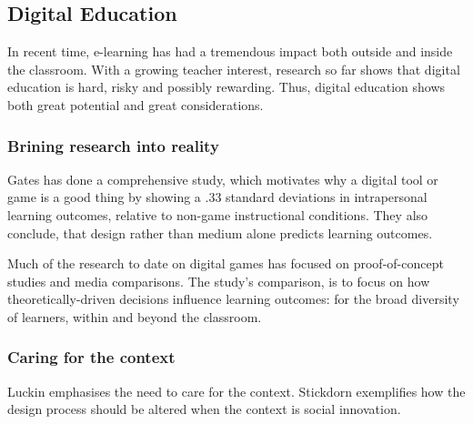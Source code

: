 



    

    

    \subsection{Digital Education}

    In recent time, e-learning has had a tremendous impact both outside and inside the classroom. With a growing teacher interest, research so far shows that digital education is hard, risky and possibly rewarding. Thus, digital education shows both great potential and great considerations.

    \subsubsection{Brining research into reality}

    Gates \cite{gates} has done a comprehensive study, which motivates why a digital tool or game is a good thing by showing a .33 standard deviations in intrapersonal learning outcomes, relative to non-game instructional conditions. They also conclude, that design rather than medium alone predicts learning outcomes.

    Much of the research to date on digital games has focused on proof-of-concept studies and media comparisons. The study's comparison, is to focus on how theoretically-driven decisions influence learning outcomes: for the broad diversity of learners, within and beyond the classroom.

    \subsubsection{Caring for the context}
    Luckin \cite{luckin} emphasises the need to care for the context. Stickdorn \cite{stickdorn} exemplifies how the design process should be altered when the context is social innovation.

